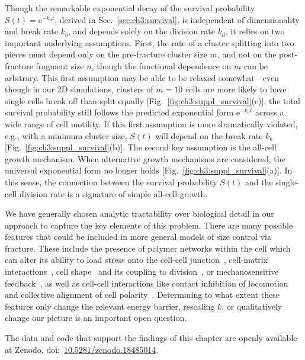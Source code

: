 Though the remarkable exponential decay of the survival probability $S(t)=\mathrm{e}^{-k_d t}$, derived in Sec.~\ref{sec:ch3:survival}, is independent of dimensionality and break rate $k_b$, and depends solely on the division rate $k_d$, it relies on two important underlying assumptions. First, the rate of a cluster splitting into two pieces must depend only on the pre-fracture cluster size $m$, and not on the post-fracture fragment size $n$, though the functional dependence on $m$ can be arbitrary. This first assumption may be able to be relaxed somewhat---even though in our 2D simulations, clusters of $m = 10$ cells are more likely to have single cells break off than split equally [Fig.~\ref{fig:ch3:suppl_survival}(c)], the total survival probability still follows the predicted exponential form $\mathrm{e}^{-k_d t}$ across a wide range of cell motility. If this first assumption is more dramatically violated, e.g., with a minimum cluster size, $S(t)$ will depend on the break rate $k_b$ [Fig.~\ref{fig:ch3:suppl_survival}(b)]. The second key assumption is the all-cell growth mechanism. When alternative growth mechanisms are considered, the universal exponential form no longer holds [Fig.~\ref{fig:ch3:suppl_survival}(a)]. In this sense, the connection between the survival probability $S(t)$ and the single-cell division rate is a signature of simple all-cell growth.

We have generally chosen analytic tractability over biological detail in our approach to capture the key elements of this problem. There are many possible features that could be included in more general models of size control via fracture. These include the presence of polymer networks within the cell which can alter its ability to load stress onto the cell-cell junction~\cite{duque2024rupture}, cell-matrix interactions~\cite{zhang2025emergence,perez2024deposited}, cell shape~\cite{wang2025confinement,chen2022activation} and its coupling to division~\cite{kaiyrbekov2023migration,puliafito2012collective}, or mechanosensitive feedback~\cite{mcevoy2022feedback}, as well as cell-cell interactions like contact inhibition of locomotion~\cite{mayor2010keeping,camley2014polarity,wang2024limits,zimmermann2016contact} and collective alignment of cell polarity~\cite{camley2017physical,jain2020role}. Determining to what extent these features only change the relevant energy barrier, rescaling $k$, or qualitatively change our picture is an important open question.

The data and code that support the findings of this chapter
are openly available at Zenodo, doi:~\href{https://doi.org/10.5281/zenodo.18485014}{10.5281/zenodo.18485014}.


